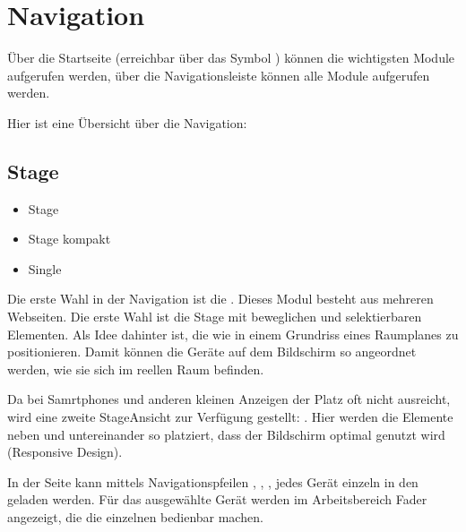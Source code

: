 \documentclass[letterpaper,10pt,ngerman]{sphinxmanual}
\begin{document}
\chapter{Navigation}
\label{\detokenize{navigation:navigation}}\label{\detokenize{navigation:navigation-label}}\label{\detokenize{navigation::doc}}
Über die Startseite (erreichbar über das Symbol ) können die
wichtigsten Module aufgerufen werden, über die Navigationsleiste
können alle Module aufgerufen werden.

Hier ist eine Übersicht über die Navigation:


\section{Stage}
\label{\detokenize{navigation:stage}}\begin{itemize}
\item {} 
Stage

\item {} 
Stage kompakt

\item {} 
Single

\end{itemize}

Die erste Wahl in der Navigation ist die . Dieses Modul besteht aus
mehreren Webseiten. Die erste Wahl ist die Stage mit beweglichen und
selektierbaren Elementen. Als Idee dahinter ist, die 
wie in einem Grundriss eines Raumplanes zu positionieren. Damit können
die Geräte auf dem Bildschirm so angeordnet werden, wie sie sich im reellen
Raum befinden.

\noindent{}

Da bei Samrtphones und anderen kleinen Anzeigen der Platz oft nicht
ausreicht, wird eine zweite Stage\sphinxhyphen{}Ansicht zur Verfügung gestellt:
. Hier werden die Elemente neben\sphinxhyphen{} und untereinander so
platziert, dass der Bildschirm optimal genutzt wird (Responsive Design).

\noindent{}

In der  Seite kann mittels Navigationspfeilen \sphinxcode{\sphinxupquote{\textless{}\textless{}}},
\sphinxcode{\sphinxupquote{\textless{}}}, \sphinxcode{\sphinxupquote{\textgreater{}}}, \sphinxcode{\sphinxupquote{\textgreater{}\textgreater{}}} jedes Gerät
einzeln in den {\hyperref[\detokenize{grundlagen:topcuelabel}]{}} geladen werden.
Für das ausgewählte Gerät werden im
Arbeitsbereich Fader angezeigt, die die einzelnen 
bedienbar machen.
\end{document}
